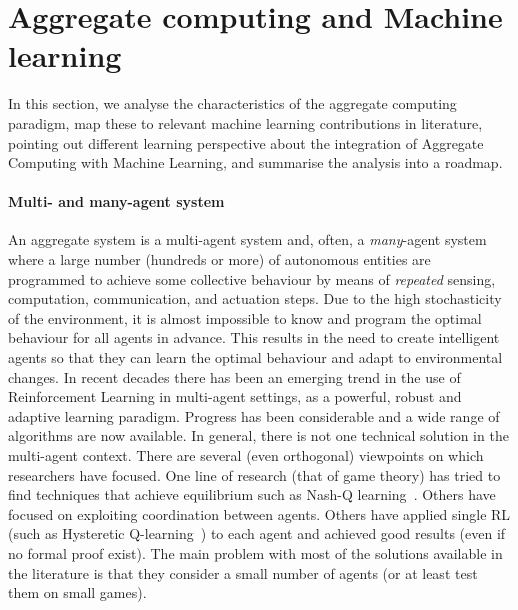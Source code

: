 \documentclass[
  twocolumn,
]{ceurart}
\begin{document}

\section{Aggregate computing and Machine learning}

In this section,
 we analyse the characteristics of the aggregate computing paradigm,
 map these to relevant machine learning contributions in literature,
 pointing out different learning perspective about the integration of Aggregate Computing with Machine Learning,
 and summarise the analysis into a roadmap.

\paragraph{Multi- and many-agent system}
%
An aggregate system is a multi-agent system
 and, often, a \emph{many}-agent system
 where a large number (hundreds or more)
 of autonomous entities are programmed to achieve 
 some collective behaviour by means of \emph{repeated} 
 sensing, computation, communication, and actuation steps.
%
Due to the high stochasticity of the environment,
 it is almost impossible to know and
 program the optimal behaviour for all agents in advance.
 This results in the need to create intelligent agents
 so that they can learn the optimal behaviour and adapt to environmental changes.
%
In recent decades there has been an emerging trend in the use of Reinforcement Learning
 in multi-agent settings, as a powerful, robust and adaptive learning paradigm.
 Progress has been considerable and a wide range of algorithms are now available.
In general, there is not one technical solution in the multi-agent context.
 There are several (even orthogonal) viewpoints on which researchers have focused.
 One line of research (that of game theory) has tried to find techniques that achieve equilibrium such as Nash-Q learning~\cite{nash-q}.
 Others have focused on exploiting coordination between agents. 
 Others have applied single RL (such as Hysteretic Q-learning~\cite{hysteretic-q}) to each agent and achieved good results (even if no formal proof exist).
%
 The main problem with most of the solutions available in the literature is that they consider a small number of agents (or at least test them on small games).
\end{document}
